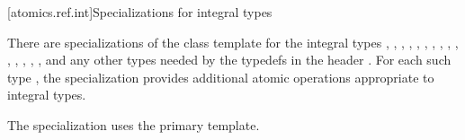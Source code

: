 [atomics.ref.int]{Specializations for integral types}

\pnum
{}%
There are specializations of the  class template
for the integral types
,
,
,
,
,
,
,
,
,
,
,
,
,
,
,
and any other types needed by the typedefs in the header .
For each such type ,
the specialization  provides
additional atomic operations appropriate to integral types.
\begin{note}
The specialization 
uses the primary template.
\end{note}


